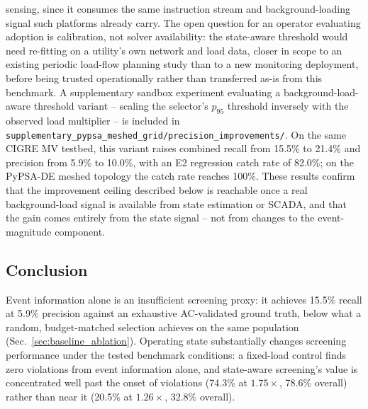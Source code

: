 \documentclass[11pt,conference]{IEEEtran}
\begin{document}
sensing, since it consumes the same instruction stream and background-loading signal such platforms
already carry. The open question for an operator evaluating adoption is calibration, not solver
availability: the state-aware threshold would need re-fitting on a utility's own network and load
data, closer in scope to an existing periodic load-flow planning study than to a new monitoring
deployment, before being trusted operationally rather than transferred as-is from this benchmark.
A supplementary sandbox experiment evaluating a background-load-aware threshold variant -- scaling
the selector's $p_{95}$ threshold inversely with the observed load multiplier -- is included in
\texttt{supplementary\_pypsa\_meshed\_grid/precision\_improvements/}. On the same CIGRE MV testbed,
this variant raises combined recall from 15.5\% to 21.4\% and precision from 5.9\% to 10.0\%, with
an E2 regression catch rate of 82.0\%; on the PyPSA-DE meshed topology the catch rate reaches
100\%. These results confirm that the improvement ceiling described below is reachable once a
real background-load signal is available from state estimation or SCADA, and that the gain comes
entirely from the state signal -- not from changes to the event-magnitude component.

\subsection{Conclusion}
Event information alone is an insufficient screening proxy: it achieves 15.5\% recall at 5.9\%
precision against an exhaustive AC-validated ground truth, below what a random, budget-matched
selection achieves on the same population (Sec.~\ref{sec:baseline_ablation}). Operating state
substantially changes screening performance under the tested benchmark conditions: a fixed-load
control finds zero violations from event information alone, and state-aware screening's value is
concentrated well past the onset of violations (74.3\% at $1.75\times$, 78.6\% overall) rather than
near it (20.5\% at $1.26\times$, 32.8\% overall).
\end{document}

